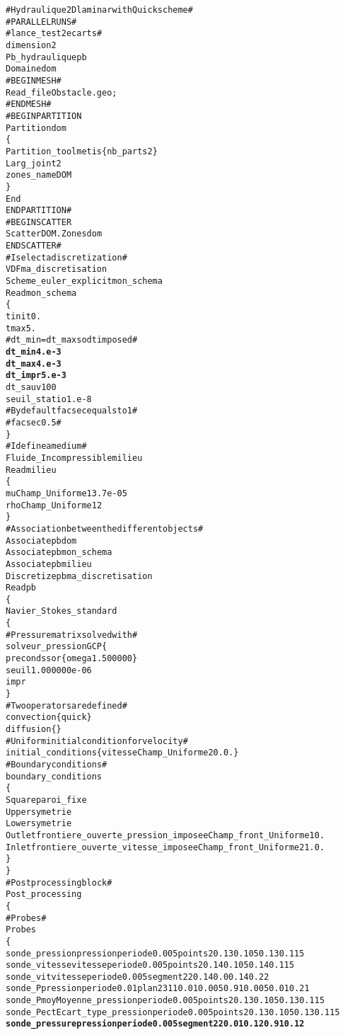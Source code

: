 \begin{alltt}
# Hydraulique 2D laminar with Quick scheme #
# PARALLEL RUNS # 
# lance_test 2 ecarts # 
dimension 2 
Pb_hydraulique pb 
Domaine dom 
# BEGIN MESH # 
Read_file Obstacle.geo ; 
# END MESH # 
# BEGIN PARTITION 
Partition dom 
\{ 
    Partition_tool metis \{ nb_parts 2 \} 
    Larg_joint 2 
    zones_name DOM 
\} 
End 
END PARTITION # 
# BEGIN SCATTER 
Scatter DOM.Zones dom 
END SCATTER # 
# I select a discretization # 
VDF ma_discretisation 
Scheme_euler_explicit mon_schema 
Read mon_schema 
\{ 
    tinit 0. 
    tmax 5. 
    # dt_min=dt_max so dt imposed # 
    {\bf{dt_min 4.e-3}}
    {\bf{dt_max 4.e-3}}
    {\bf{dt_impr 5.e-3}}
    dt_sauv 100 
    seuil_statio 1.e-8 
    # By default facsec equals to 1 # 
    # facsec 0.5 # 
\} 
# I define a medium # 
Fluide_Incompressible milieu 
Read milieu 
\{ 
    mu Champ_Uniforme 1 3.7e-05 
    rho Champ_Uniforme 1 2 
\} 
# Association between the different objects # 
Associate pb dom 
Associate pb mon_schema 
Associate pb milieu 
Discretize pb ma_discretisation 
Read pb 
\{ 
    Navier_Stokes_standard 
    \{ 
        # Pressure matrix solved with # 
            solveur_pression GCP \{  
            precond ssor \{ omega 1.500000 \}  
            seuil 1.000000e-06  
            impr  
        \} 
        # Two operators are defined # 
        convection \{ quick \} 
        diffusion \{ \} 
        # Uniform initial condition for velocity # 
        initial_conditions \{ vitesse Champ_Uniforme 2 0. 0. \}
        # Boundary conditions # 
        boundary_conditions 
        \{ 
            Square      paroi_fixe 
            Upper       symetrie 
            Lower       symetrie 
            Outlet      frontiere_ouverte_pression_imposee Champ_front_Uniforme 1 0. 
            Inlet       frontiere_ouverte_vitesse_imposee Champ_front_Uniforme 2 1. 0. 
        \} 
    \} 
    # Post processing block # 
    Post_processing
    \{ 
        # Probes # 
        Probes 
        \{ 
            sonde_pression  pression     periode 0.005   points 2 0.13 0.105 0.13 0.115 
            sonde_vitesse   vitesse      periode 0.005   points 2 0.14 0.105    0.14 0.115 
            sonde_vit       vitesse      periode 0.005   segment 22 0.14 0.0 0.14 0.22 
            sonde_P         pression     periode 0.01    plan 23 11 0.01 0.005 0.91 0.005 0.01 0.21 
            sonde_Pmoy      Moyenne_pression    periode 0.005   points 2 0.13 0.105 0.13 0.115 
            sonde_Pect      Ecart_type_pression periode 0.005   points 2 0.13 0.105 0.13 0.115 
            {\bf{sonde_pressure   pression  periode 0.005   segment 22 0.01 0.12 0.91 0.12}}

\end{alltt}
